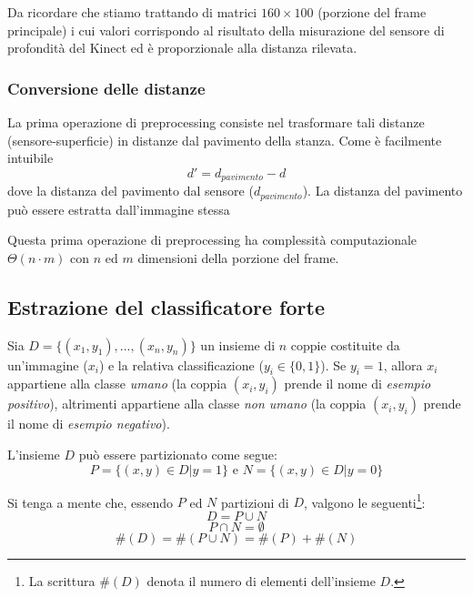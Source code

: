 Da ricordare che stiamo trattando di matrici $160 \times 100$ (porzione del frame principale) i cui valori corrispondo al risultato della misurazione del sensore di profondità del Kinect ed è proporzionale alla distanza rilevata.

\subsubsection{Conversione delle distanze} %
\label{ssub:conversione_delle_distanze}
La prima operazione di preprocessing consiste nel trasformare tali distanze (sensore-superficie) in distanze dal pavimento della stanza. Come è facilmente intuibile
$$ d' = d_{pavimento} - d $$
dove la distanza del pavimento dal sensore ($d_{pavimento}$). La distanza del pavimento può essere estratta dall'immagine stessa

Questa prima operazione di preprocessing ha complessità computazionale $\Theta(n \cdot m)$ con $n$ ed $m$ dimensioni della porzione del frame.

\subsection{Estrazione del classificatore forte} %
\label{sub:estrazione_del_classificatore_forte}
Sia $D = \{(x_1, y_1), ..., (x_n, y_n)\}$ un insieme di $n$ coppie costituite da un'immagine ($x_i$) e la relativa classificazione ($y_i \in \{ 0, 1 \}$). Se $y_i = 1$, allora $x_i$ appartiene alla classe \emph{umano} (la coppia $(x_i, y_i)$ prende il nome di \emph{esempio positivo}), altrimenti appartiene alla classe \emph{non umano} (la coppia $(x_i, y_i)$ prende il nome di \emph{esempio negativo}).

L'insieme $D$ può essere partizionato come segue:
$$P = \{(x, y) \in D | y = 1\} \text{ e } N = \{(x,y) \in D | y = 0\}$$

Si tenga a mente che, essendo $P$ ed $N$ partizioni di $D$, valgono le seguenti\footnote{La scrittura $\#(D)$ denota il numero di elementi dell'insieme $D$.}:
\begin{equation}
    D = P \cup N
\end{equation}
\begin{equation}
    P \cap N = \emptyset
\end{equation}
\begin{equation}
    \#(D) = \#(P \cup N) = \#(P) + \#(N)
\end{equation}

